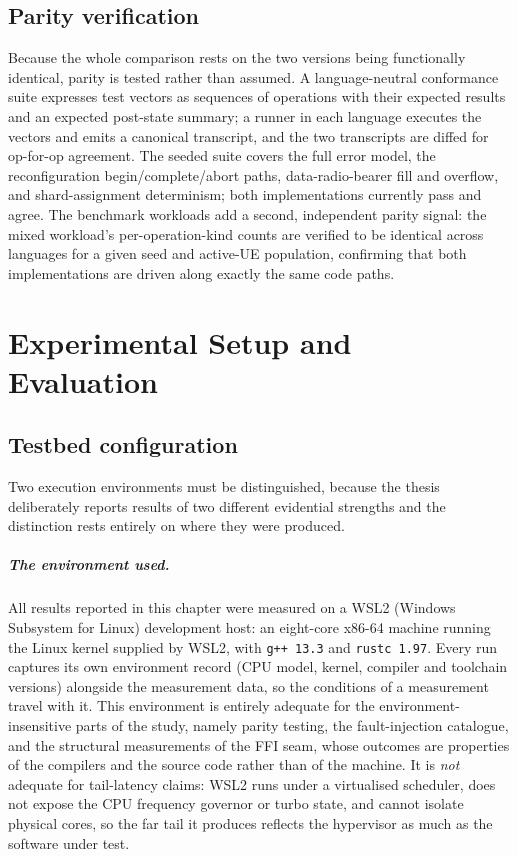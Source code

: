 \documentclass[english,twoside,openright,a4paper,censored,csm,software-track-2020]{HYthesisML}
\begin{document}
\section{Parity verification}
\label{sec:parity}
Because the whole comparison rests on the two versions being functionally identical, parity
is tested rather than assumed. A language-neutral conformance suite expresses test vectors as
sequences of operations with their expected results and an expected post-state summary; a
runner in each language executes the vectors and emits a canonical transcript, and the two
transcripts are diffed for op-for-op agreement. The seeded suite covers the full error model,
the reconfiguration begin/complete/abort paths, data-radio-bearer fill and overflow, and
shard-assignment determinism; both implementations currently pass and agree. The benchmark
workloads add a second, independent parity signal: the mixed workload's per-operation-kind
counts are verified to be identical across languages for a given seed and active-UE
population, confirming that both implementations are driven along exactly the same code paths.

\chapter{Experimental Setup and Evaluation\label{chapter:eval}}

\section{Testbed configuration\label{sec:testbed}}
Two execution environments must be distinguished, because the thesis deliberately reports
results of two different evidential strengths and the distinction rests entirely on where
they were produced.

\paragraph{The environment used.}
All results reported in this chapter were measured on a WSL2 (Windows Subsystem for Linux)
development host: an eight-core x86-64 machine running the Linux kernel supplied by WSL2,
with \texttt{g++~13.3} and \texttt{rustc~1.97}. Every run captures its own environment record
(CPU model, kernel, compiler and toolchain versions) alongside the measurement data, so the
conditions of a measurement travel with it. This environment is entirely adequate for the
environment-insensitive parts of the study, namely parity testing, the fault-injection
catalogue, and the structural measurements of the FFI seam, whose outcomes are properties of
the compilers and the source code rather than of the machine. It is \emph{not} adequate for
tail-latency claims: WSL2 runs under a virtualised scheduler, does not expose the CPU
frequency governor or turbo state, and cannot isolate physical cores, so the far tail it
produces reflects the hypervisor as much as the software under test.
\end{document}
